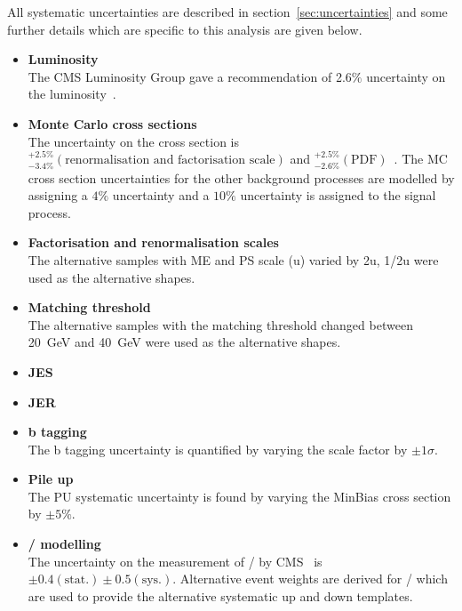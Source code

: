All systematic uncertainties are described in section~\ref{sec:uncertainties} and some further details which are specific to this \runone analysis are given below.

\begin{itemize}
\item \textbf{Luminosity}\\
The CMS Luminosity Group gave a recommendation of 2.6$\%$ uncertainty on the luminosity~\cite{CMS-PAS-LUM-12-001}.
\item \textbf{Monte Carlo cross sections}\\
The uncertainty on the \ttbar cross section is ${}^{+2.5\%}_{-3.4\%} \left( \textrm{renormalisation and factorisation scale} \right)$ and ${}^{+2.5\%}_{-2.6\%} \left( \textrm{PDF} \right)$~\cite{PhysRevLett.110.252004}. The MC cross section uncertainties for the other background processes are modelled by assigning a $4\%$ uncertainty and a $10\%$ uncertainty is assigned to the signal process.
\item \textbf{Factorisation and renormalisation scales}\\
The alternative \ttbar samples with ME and PS scale (u) varied by 2u, 1/2u were used as the alternative shapes.
\item \textbf{Matching threshold}\\
The alternative \ttbar samples with the matching threshold changed between 20~GeV and 40~GeV were used as the alternative shapes.
\item \textbf{JES}\\
\item \textbf{JER}\\
\item \textbf{b tagging}\\
The b tagging uncertainty is quantified by varying the scale factor by $\pm1\sigma$.
\item \textbf{Pile up}\\
The PU systematic uncertainty is found by varying the MinBias cross section by $\pm5\%$.
\item \textbf{\heavyflavourone / \heavyflavourtwo modelling}\\
The uncertainty on the measurement of \heavyflavourone / \heavyflavourtwo by CMS~\cite{Khachatryan2015132} is $\pm 0.4 \left( \textrm{stat.} \right) \pm 0.5 \left(\textrm{sys.} \right)$. Alternative event weights are derived for \heavyflavourone / \heavyflavourtwo which are used to provide the alternative systematic up and down templates.
 \end{itemize}
